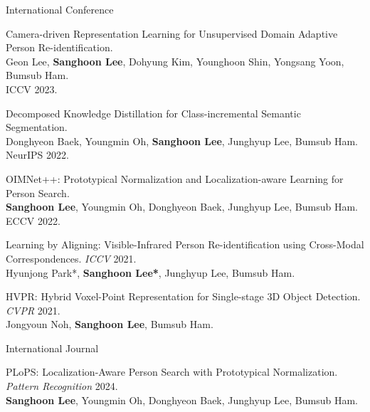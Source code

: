 
\begin{cventries}

\cventry
    {} %
    {International Conference} %
    {} %
    {} %
    {
      \begin{cvitems} %
        \item {Camera-driven Representation Learning for Unsupervised Domain Adaptive Person Re-identification. \\ Geon Lee, \textbf{Sanghoon Lee}, Dohyung Kim, Younghoon Shin, Yongsang Yoon, Bumsub Ham. \\ ICCV 2023.}
        \item {Decomposed Knowledge Distillation for Class-incremental Semantic Segmentation. \\ Donghyeon Baek, Youngmin Oh, \textbf{Sanghoon Lee}, Junghyup Lee, Bumsub Ham. \\ NeurIPS 2022.}
        \item {OIMNet++: Prototypical Normalization and Localization-aware Learning for Person Search. \\ \textbf{Sanghoon Lee}, Youngmin Oh, Donghyeon Baek, Junghyup Lee, Bumsub Ham. \\ ECCV 2022.}
        \item {Learning by Aligning: Visible-Infrared Person Re-identification using Cross-Modal Correspondences. \textit{ICCV} 2021.\\ Hyunjong Park*, \textbf{Sanghoon Lee*}, Junghyup Lee, Bumsub Ham.}
        \item {HVPR: Hybrid Voxel-Point Representation for Single-stage 3D Object Detection. \textit{CVPR} 2021.\\ Jongyoun Noh, \textbf{Sanghoon Lee}, Bumsub Ham.}
      \end{cvitems}
    }

\cventry
    {} %
    {International Journal} %
    {} %
    {} %
    {
      \begin{cvitems} %
        \item {PLoPS: Localization-Aware Person Search with Prototypical Normalization. \textit{Pattern Recognition} 2024.\\ \textbf{Sanghoon Lee}, Youngmin Oh, Donghyeon Baek, Junghyup Lee, Bumsub Ham.}
      \end{cvitems}
    }



\end{cventries}